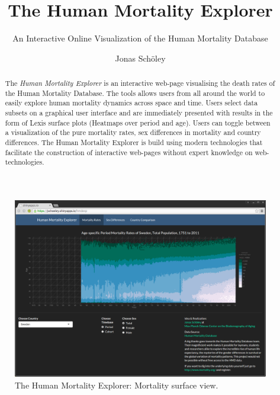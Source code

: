 \documentclass[
  12pt
]{scrartcl}
\title{The Human Mortality Explorer}
\subtitle{An Interactive Online Visualization of the Human Mortality Database}
\author{Jonas Schöley}
\begin{document}
\maketitle

\begin{abstract}
The \emph{Human Mortality Explorer} is an interactive web-page visualising the death rates of the Human Mortality Database. The tools allows users from all around the world to easily explore human mortality dynamics across space and time. Users select data subsets on a graphical user interface and are immediately presented with results in the form of Lexis surface plots (Heatmaps over period and age). Users can toggle between a visualization of the pure mortality rates, sex differences in mortality and country differences. The Human Mortality Explorer is build using modern technologies that facilitate the construction of interactive web-pages without expert knowledge on web-technologies.
\end{abstract}


\begin{figure}[ht!]
  \includegraphics[width = \linewidth]{./fig/hmd_screen_mx.png}
  \caption{The Human Mortality Explorer: Mortality surface view.}
\end{figure}
\end{document}
